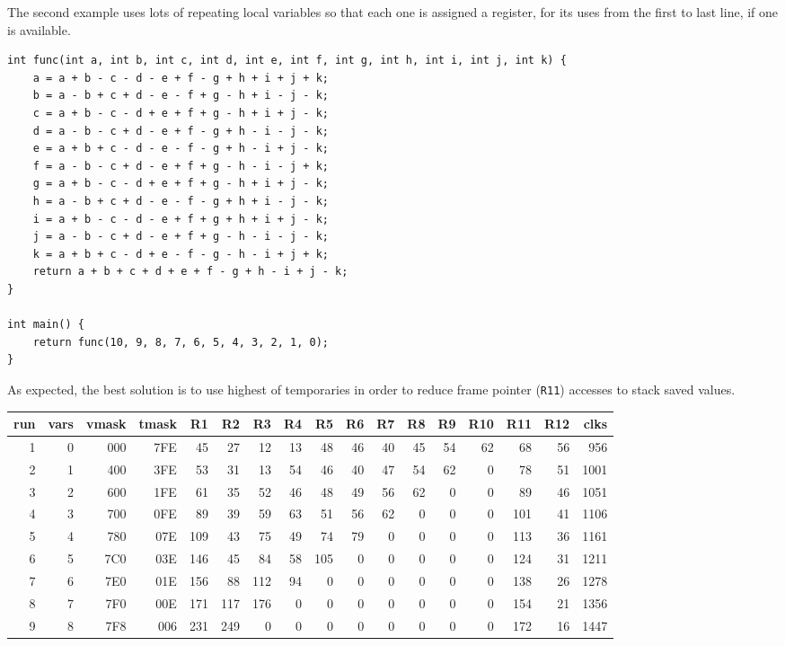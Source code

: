 The second example uses lots of repeating local variables so that each one is assigned
a register, for its uses from the first to last line, if one is available.

\begin{verbatim}
int func(int a, int b, int c, int d, int e, int f, int g, int h, int i, int j, int k) {
    a = a + b - c - d - e + f - g + h + i + j + k;
    b = a - b + c + d - e - f + g - h + i - j - k;
    c = a + b - c - d + e + f + g - h + i + j - k;
    d = a - b - c + d - e + f - g + h - i - j - k;
    e = a + b + c - d - e - f - g + h - i + j - k;
    f = a - b - c + d - e + f + g - h - i - j + k;
    g = a + b - c - d + e + f + g - h + i + j - k;
    h = a - b + c + d - e - f - g + h + i - j - k;
    i = a + b - c - d - e + f + g + h + i + j - k;
    j = a - b - c + d - e + f + g - h - i - j - k;
    k = a + b + c - d + e - f - g - h - i + j + k;
    return a + b + c + d + e + f - g + h - i + j - k;
}

int main() {
    return func(10, 9, 8, 7, 6, 5, 4, 3, 2, 1, 0);
}
\end{verbatim}

As expected, the best solution is to use highest of temporaries in order
to reduce frame pointer ({\tt R11}) accesses to stack saved values.

\begin{center}
{\small
\begin{tabular}{r|r|r|r|r|r|r|r|r|r|r|r|r|r|r|r|r}
run&vars&vmask&tmask&R1&R2&R3&R4&R5&R6&R7&R8&R9&R10&R11&R12&clks\\\hline
1&0&000&7FE&45&27&12&13&48&46&40&45&54&62&68&56&956\\
2&1&400&3FE&53&31&13&54&46&40&47&54&62&0&78&51&1001\\
3&2&600&1FE&61&35&52&46&48&49&56&62&0&0&89&46&1051\\
4&3&700&0FE&89&39&59&63&51&56&62&0&0&0&101&41&1106\\
5&4&780&07E&109&43&75&49&74&79&0&0&0&0&113&36&1161\\
6&5&7C0&03E&146&45&84&58&105&0&0&0&0&0&124&31&1211\\
7&6&7E0&01E&156&88&112&94&0&0&0&0&0&0&138&26&1278\\
8&7&7F0&00E&171&117&176&0&0&0&0&0&0&0&154&21&1356\\
9&8&7F8&006&231&249&0&0&0&0&0&0&0&0&172&16&1447\\
\end{tabular}
}
\end{center}
\vspace*{5mm}

